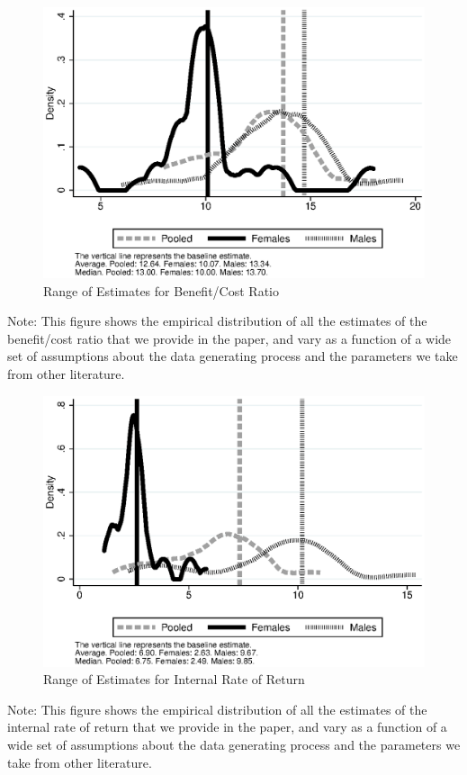 \documentclass[static]{JJH-Beamer}
\begin{document}
\begin{frame}

\begin{figure}[H]
\caption{Range of Estimates for Benefit/Cost Ratio}
\begin{center}
\includegraphics[width=.7\columnwidth]{output/overalldist_IRR.eps}
\end{center}
\end{figure}
{\flushleft \scriptsize Note: This figure shows the empirical distribution of all the estimates of the benefit/cost ratio that we provide in the paper, and vary as a function of a wide set of assumptions about the data generating process and the parameters we take from other literature.\\}

\end{frame}

\begin{frame}

\begin{figure}[H]
\caption{Range of Estimates for Internal Rate of Return}
\begin{center}
\includegraphics[width=.7\columnwidth]{output/overalldist_BCRatio.eps}
\end{center}
\end{figure}
{\flushleft \scriptsize Note: This figure shows the empirical distribution of all the estimates of the internal rate of return that we provide in the paper, and vary as a function of a wide set of assumptions about the data generating process and the parameters we take from other literature.\\}

\end{frame}
\end{document}
